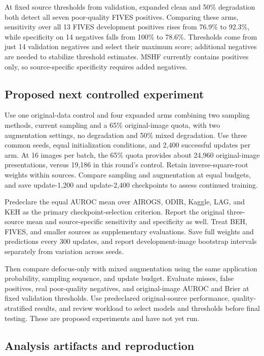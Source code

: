 \documentclass[
  10pt,
]{article}
\begin{document}
At fixed source thresholds from validation, expanded clean and 50\%
degradation both detect all seven poor-quality FIVES positives.
Comparing these arms, sensitivity over all 13 FIVES development
positives rises from 76.9\% to 92.3\%, while specificity on 14 negatives
falls from 100\% to 78.6\%. Thresholds come from just 14 validation
negatives and select their maximum score; additional negatives are
needed to stabilize threshold estimates. MSHF currently contains
positives only, so source-specific specificity requires added negatives.

\subsection{Proposed next controlled
experiment}\label{proposed-next-controlled-experiment}

Use one original-data control and four expanded arms combining two
sampling methods, current sampling and a 65\% original-image quota, with
two augmentation settings, no degradation and 50\% mixed degradation.
Use three common seeds, equal initialization conditions, and 2,400
successful updates per arm. At 16 images per batch, the 65\% quota
provides about 24,960 original-image presentations, versus 19,186 in
this round's control. Retain inverse-square-root weights within sources.
Compare sampling and augmentation at equal budgets, and save
update-1,200 and update-2,400 checkpoints to assess continued training.

Predeclare the equal AUROC mean over AIROGS, ODIR, Kaggle, LAG, and KEH
as the primary checkpoint-selection criterion. Report the original
three-source mean and source-specific sensitivity and specificity as
well. Treat BEH, FIVES, and smaller sources as supplementary
evaluations. Save full weights and predictions every 300 updates, and
report development-image bootstrap intervals separately from variation
across seeds.

Then compare defocus-only with mixed augmentation using the same
application probability, sampling sequence, and update budget. Evaluate
misses, false positives, real poor-quality negatives, and original-image
AUROC and Brier at fixed validation thresholds. Use predeclared
original-source performance, quality-stratified results, and review
workload to select models and thresholds before final testing. These are
proposed experiments and have not yet run.

\subsection{Analysis artifacts and
reproduction}\label{analysis-artifacts-and-reproduction}
\end{document}
